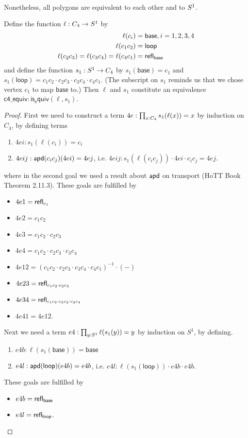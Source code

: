 Nonetheless, all polygons are equivalent to each other and to \( S^1 \).

\begin{mylemma}
\label{lem:c4equiv}
Define the function \( \ell:C_4\to S^1 \) by
\begin{align*}
\ell(c_i)&=\mathsf{base}, i=1, 2, 3, 4 \\
\ell(c_1c_2)&=\mathsf{loop} \\
\ell(c_2c_3)=\ell(c_3c_4)=\ell(c_4c_1)&=\mathsf{refl}_{\mathsf{base}}
\end{align*}
and define the function \( s_1:S^1\to C_4 \) by \( s_1(\mathsf{base})=c_1 \) and \( s_1(\mathsf{loop})=c_1c_2\cdot c_2c_3\cdot c_3c_4\cdot c_4c_1 \). (The subscript on \( s_1 \) reminds us that we chose vertex \( c_1 \) to map \( \mathsf{base} \) to.) Then \( \ell \) and \( s_1 \) constitute an equivalence \( \mathsf{c4\_equiv}:\mathsf{is_equiv}(\ell,s_1) \).
\end{mylemma}
\begin{proof}
First we need to construct a term \( 4e:\prod_{x:C_4}s_1(\ell(x))=x \) by induction on \( C_4 \), by defining terms
\begin{enumerate}
\item \( 4ei:s_1(\ell(c_i))=c_i \)
\item \( 4eij:\mathsf{apd}(c_ic_j)(4ei)=4ej \), i.e. \( 4eij: s_1(\ell(c_ic_j))\cdot 4ei\cdot c_ic_j=4ej \).
\end{enumerate}
where in the second goal we used a result about \( \mathsf{apd} \) on transport (HoTT Book\cite{hottbook} Theorem 2.11.3). These goals are fulfilled by
\begin{itemize}
\item \( 4e1=\mathsf{refl}_{c_1} \)
\item \( 4e2={c_1c_2} \)
\item \( 4e3={c_1c_2\cdot c_2c_3} \)
\item \( 4e4={c_1c_2\cdot c_2c_3\cdot c_3c_4} \)
\item \( 4e12=(c_1c_2\cdot c_2c_3\cdot c_3c_4\cdot c_4c_1)^{-1}\cdot(-) \)
\item \( 4e23=\mathsf{refl}_{c_1c_2\cdot c_2c_3} \)
\item \( 4e34=\mathsf{refl}_{c_1c_2\cdot c_2c_3\cdot c_3c_4} \)
\item \( 4e41=4e12 \).
\end{itemize}
Next we need a term \( e4:\prod_{y:S^1}\ell(s_1(y))=y \) by induction on \( S^1 \), by defining.
\begin{enumerate}
\item \( e4b:\ell(s_1(\mathsf{base}))=\mathsf{base} \)
\item \( e4l:\mathsf{apd}(\mathsf{loop})(e4b)=e4b \), i.e. \( e4l:\ell(s_1(\mathsf{loop}))\cdot e4b\cdot e4b \).
\end{enumerate}
These goals are fulfilled by
\begin{itemize}
\item \( e4b=\mathsf{refl}_{\mathsf{base}} \)
\item \( e4l=\mathsf{refl}_{\mathsf{loop}} \).
\end{itemize}
\end{proof}
